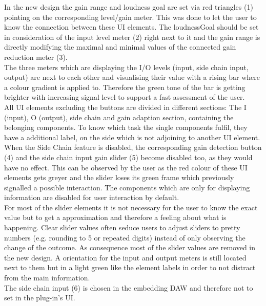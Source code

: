 In the new design the gain range and loudness goal are set via red triangles (1) pointing on the corresponding level/gain meter. This was done to let the user to know the connection between these UI elements. The loudnessGoal should be set in consideration of the input level meter (2) right next to it and the gain range is directly modifying the maximal and minimal values of the connected gain reduction meter (3).\\
The three meters which are displaying the I/O levels (input, side chain input, output) are next to each other and visualising their value with a rising bar where a colour gradient is applied to. Therefore the green tone of the bar is getting brighter with increasing signal level to support a fast assessment of the user.\\
All UI elements excluding the buttons are divided in different sections: The I (input), O (output), side chain and gain adaption section, containing the belonging components. To know which task the single components fulfil, they have a additional label, on the side which is not adjoining to another UI element.\\
When the Side Chain feature is disabled, the corresponding gain detection button (4) and the side chain input gain slider (5) become disabled too, as they would have no effect. This can be observed by the user as the red colour of these UI elements gets greyer and the slider loses its green frame which previously signalled a possible interaction. The components which are only for displaying information are disabled for user interaction by default.\\
For most of the slider elements it is not necessary for the user to know the exact value but to get a approximation and therefore a feeling about what is happening. Clear slider values often seduce users to adjust sliders to pretty numbers (e.g. rounding to 5 or repeated digits) instead of only observing the change of the outcome. As consequence most of the slider values are removed in the new design. A orientation for the input and output meters is still located next to them but in a light green like the element labels in order to not distract from the main information.\\
The side chain input (6) is chosen in the embedding DAW and therefore not to set in the plug-in’s UI.\\